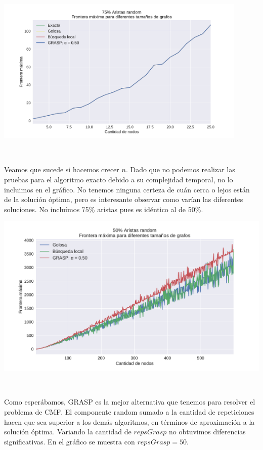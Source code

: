 {\centering
    \includegraphics[width=0.9\textwidth]{informe/imgs/exp_random75_frontera_todos_v2.pdf}
    
}
$ $ \newline

Veamos que sucede si hacemos crecer $n$. Dado que no podemos realizar las pruebas para el algoritmo exacto debido a su complejidad temporal, no lo incluimos en el gráfico. No tenemos ninguna certeza de cuán cerca o lejos están de la solución óptima, pero es interesante observar como varían las diferentes soluciones. No incluímos 75\% aristas pues es idéntico al de 50\%. \\

{\centering
    \includegraphics[width=1\textwidth]{informe/imgs/exp_random50_frontera_todos_ngrande.pdf}
    
}
$ $ \newline

Como esperábamos, GRASP es la mejor alternativa que tenemos para resolver el problema de CMF. El componente random sumado a la cantidad de repeticiones hacen que sea superior a los demás algoritmos, en términos de aproximación a la solución óptima. Variando la cantidad de $repsGrasp$ no obtuvimos diferencias significativas. En el gráfico se muestra con $repsGrasp = 50$. \\


